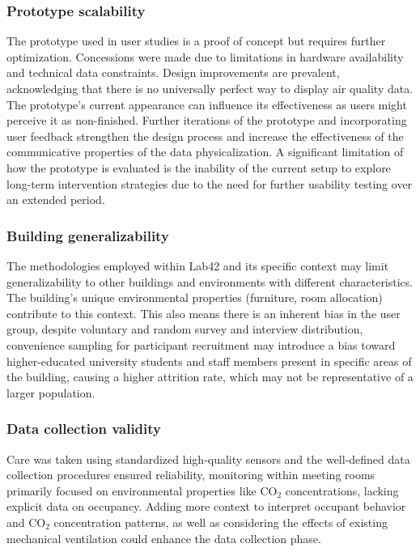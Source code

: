 \subsubsection{Prototype scalability}
The prototype used in user studies is a proof of concept but requires further optimization. Concessions were made due to limitations in hardware availability and technical data constraints. Design improvements are prevalent, acknowledging that there is no universally perfect way to display air quality data. The prototype's current appearance can influence its effectiveness as users might perceive it as non-finished. Further iterations of the prototype and incorporating user feedback strengthen the design process and increase the effectiveness of the communicative properties of the data physicalization. A significant limitation of how the prototype is evaluated is the inability of the current setup to explore long-term intervention strategies due to the need for further usability testing over an extended period. 

\subsubsection{Building generalizability}
The methodologies employed within Lab42 and its specific context may limit generalizability to other buildings and environments with different characteristics.  The building's unique environmental properties (furniture, room allocation) contribute to this context. This also means there is an inherent bias in the user group, despite voluntary and random survey and interview distribution, convenience sampling for participant recruitment may introduce a bias toward higher-educated university students and staff members present in specific areas of the building, causing a higher attrition rate, which may not be representative of a larger population. 

\subsubsection{Data collection validity}
Care was taken using standardized high-quality sensors and the well-defined data collection procedures ensured reliability, monitoring within meeting rooms primarily focused on environmental properties like CO$_{2}$ concentrations, lacking explicit data on occupancy. Adding more context to interpret occupant behavior and CO$_{2}$ concentration patterns, as well as considering the effects of existing mechanical ventilation could enhance the data collection phase.

